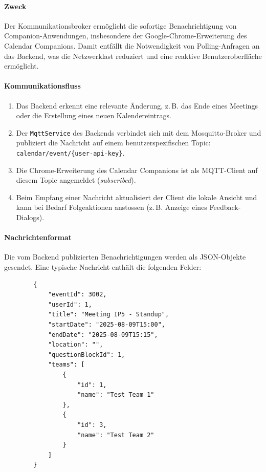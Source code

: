 \documentclass[12pt,a4paper]{report}
\begin{document}
\paragraph{Zweck}
    Der Kommunikationsbroker ermöglicht die sofortige Benachrichtigung von Companion-Anwendungen, insbesondere der Google-Chrome-Erweiterung des Calendar Companions.
    Damit entfällt die Notwendigkeit von Polling-Anfragen an das Backend, was die Netzwerklast reduziert und eine reaktive Benutzeroberfläche ermöglicht.

\paragraph{Kommunikationsfluss}
    \begin{enumerate}
        \item Das Backend erkennt eine relevante Änderung, z.\,B. das Ende eines Meetings oder die Erstellung eines neuen Kalendereintrags.
        \item Der \texttt{MqttService} des Backends verbindet sich mit dem Mosquitto-Broker und publiziert die Nachricht auf einem benutzerspezifischen Topic:
            \texttt{calendar/event/\{user-api-key\}}.
        \item Die Chrome-Erweiterung des Calendar Companions ist als MQTT-Client auf diesem Topic angemeldet (\textit{subscribed}).
        \item Beim Empfang einer Nachricht aktualisiert der Client die lokale Ansicht und kann bei Bedarf Folgeaktionen anstossen (z.\,B. Anzeige eines Feedback-Dialogs).
    \end{enumerate}

\paragraph{Nachrichtenformat}
    Die vom Backend publizierten Benachrichtigungen werden als JSON-Objekte gesendet.
    Eine typische Nachricht enthält die folgenden Felder:

    \begin{verbatim}
        {
            "eventId": 3002,
            "userId": 1,
            "title": "Meeting IP5 - Standup",
            "startDate": "2025-08-09T15:00",
            "endDate": "2025-08-09T15:15",
            "location": "",
            "questionBlockId": 1,
            "teams": [
                {
                    "id": 1,
                    "name": "Test Team 1"
                },
                {
                    "id": 3,
                    "name": "Test Team 2"
                }
            ]
        }
    \end{verbatim}
\end{document}
